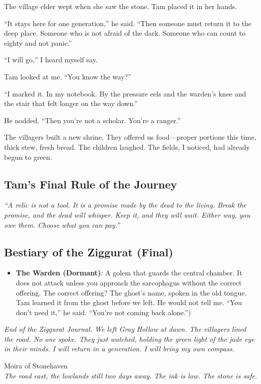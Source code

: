 \documentclass[11pt]{article}
\begin{document}
The village elder wept when she saw the stone. Tam placed it in her hands.

``It stays here for one generation,'' he said. ``Then someone must return it to the deep place. Someone who is not afraid of the dark. Someone who can count to eighty and not panic.''

``I will go,'' I heard myself say.

Tam looked at me. ``You know the way?''

``I marked it. In my notebook. By the pressure eels and the warden's knee and the stair that felt longer on the way down.''

He nodded. ``Then you're not a scholar. You're a ranger.''

The villagers built a new shrine. They offered us food---proper portions this time, thick stew, fresh bread. The children laughed. The fields, I noticed, had already begun to green.

\subsection*{Tam's Final Rule of the Journey}
\textit{``A relic is not a tool. It is a promise made by the dead to the living. Break the promise, and the dead will whisper. Keep it, and they will wait. Either way, you owe them. Choose what you can pay.''}

\subsection*{Bestiary of the Ziggurat (Final)}
\begin{itemize}
    \item \textbf{The Warden (Dormant)}: A golem that guards the central chamber. It does not attack unless you approach the sarcophagus without the correct offering. The correct offering? The ghost's name, spoken in the old tongue. Tam learned it from the ghost before we left. He would not tell me. ``You don't need it,'' he said. ``You're not coming back alone.'')
\end{itemize}

\vspace{2em}
\textit{End of the Ziggurat Journal. We left Gray Hollow at dawn. The villagers lined the road. No one spoke. They just watched, holding the green light of the jade eye in their minds. I will return in a generation. I will bring my own compass.}

\noindent Moira of Stonehaven\\
\textit{The road east, the lowlands still two days away. The ink is low. The stone is safe.}



\end{document}
